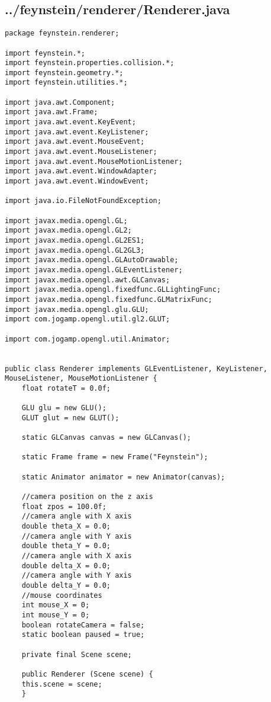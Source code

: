 \subsection*{../feynstein/renderer/Renderer.java}
\begin{lstlisting}
package feynstein.renderer;

import feynstein.*;
import feynstein.properties.collision.*;
import feynstein.geometry.*;
import feynstein.utilities.*;

import java.awt.Component;
import java.awt.Frame;
import java.awt.event.KeyEvent;
import java.awt.event.KeyListener;
import java.awt.event.MouseEvent;
import java.awt.event.MouseListener;
import java.awt.event.MouseMotionListener;
import java.awt.event.WindowAdapter;
import java.awt.event.WindowEvent;
 
import java.io.FileNotFoundException;

import javax.media.opengl.GL;
import javax.media.opengl.GL2;
import javax.media.opengl.GL2ES1;
import javax.media.opengl.GL2GL3;
import javax.media.opengl.GLAutoDrawable;
import javax.media.opengl.GLEventListener;
import javax.media.opengl.awt.GLCanvas;
import javax.media.opengl.fixedfunc.GLLightingFunc;
import javax.media.opengl.fixedfunc.GLMatrixFunc;
import javax.media.opengl.glu.GLU;
import com.jogamp.opengl.util.gl2.GLUT; 
 
import com.jogamp.opengl.util.Animator;


public class Renderer implements GLEventListener, KeyListener, MouseListener, MouseMotionListener {
    float rotateT = 0.0f;
	
    GLU glu = new GLU();
    GLUT glut = new GLUT();

    static GLCanvas canvas = new GLCanvas();
 
    static Frame frame = new Frame("Feynstein");
 
    static Animator animator = new Animator(canvas);
	
    //camera position on the z axis
    float zpos = 100.0f;
    //camera angle with X axis
    double theta_X = 0.0;
    //camera angle with Y axis
    double theta_Y = 0.0;
    //camera angle with X axis
    double delta_X = 0.0;
    //camera angle with Y axis
    double delta_Y = 0.0;
    //mouse coordinates
    int mouse_X = 0;
    int mouse_Y = 0;
    boolean rotateCamera = false;
    static boolean paused = true;
	
    private final Scene scene;
 
    public Renderer (Scene scene) {
	this.scene = scene;
    }


\end{lstlisting}
